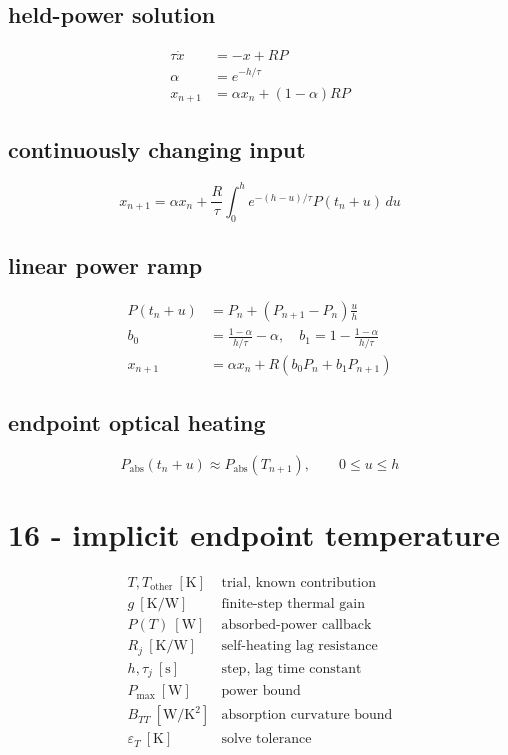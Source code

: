 \subsection*{held-power solution}
\[
\displaystyle \begin{aligned}\tau\dot x&=-x+RP\\\alpha&=e^{-h/\tau}\\x_{n+1}&=\alpha x_n+(1-\alpha)RP\end{aligned}
\]

\subsection*{continuously changing input}
\[
\displaystyle x_{n+1}=\alpha x_n+\frac R\tau\int_0^h e^{-(h-u)/\tau}P(t_n+u)\,du
\]

\subsection*{linear power ramp}
\[
\displaystyle \begin{aligned}P(t_n+u)&=P_n+(P_{n+1}-P_n)\frac uh\\b_0&=\frac{1-\alpha}{h/\tau}-\alpha,\quad b_1=1-\frac{1-\alpha}{h/\tau}\\x_{n+1}&=\alpha x_n+R(b_0P_n+b_1P_{n+1})\end{aligned}
\]

\subsection*{endpoint optical heating}
\[
\displaystyle P_{\mathrm{abs}}(t_n+u)\approx P_{\mathrm{abs}}(T_{n+1}),\qquad0\le u\le h
\]

\clearpage
\section*{16 - implicit endpoint temperature}

\[
\begin{array}{ll}T,T_{\mathrm{other}}\ [\mathrm K]&\text{trial, known contribution}\\[0.6em]g\ [\mathrm{K/W}]&\text{finite-step thermal gain}\\[0.6em]P(T)\ [\mathrm W]&\text{absorbed-power callback}\\[0.6em]R_j\ [\mathrm{K/W}]&\text{self-heating lag resistance}\\[0.6em]h,\tau_j\ [\mathrm s]&\text{step, lag time constant}\\[0.6em]P_{\max}\ [\mathrm W]&\text{power bound}\\[0.6em]B_{TT}\ [\mathrm{W/K^2}]&\text{absorption curvature bound}\\[0.6em]\varepsilon_T\ [\mathrm K]&\text{solve tolerance}\end{array}
\]

